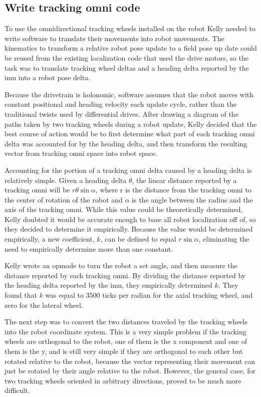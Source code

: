 \documentclass{article}
\begin{document}
\subsection{Write tracking omni code}
To use the omnidirectional tracking wheels installed on the robot Kelly needed to write software to translate their movements into robot movements. The kinematics to transform a relative robot pose update to a field pose up date could be reused from the existing localization code that used the drive motors, so the task was to translate tracking wheel deltas and a heading delta reported by the imu into a robot pose delta. 

Because the drivetrain is holonomic, software assumes that the robot moves with constant positional and heading velocity each update cycle, rather than the traditional twists used by differential drives. 
After drawing a diagram of the paths taken by two tracking wheels during a robot update, Kelly decided that the best course of action would be to first determine what part of each tracking omni delta was accounted for by the heading delta, and then transform the resulting vector from tracking omni space into robot space. 

Accounting for the portion of a tracking omni delta caused by a heading delta is relatively simple. Given a heading delta $\theta$, the linear distance reported by a tracking omni will be $r \theta \sin\alpha$, where r is the distance from the tracking omni to the center of rotation of the robot and $\alpha$ is the angle between the radius and the axis of the tracking omni. While this value could be theoretically determined, Kelly doubted it would be accurate enough to base all robot localization off of, so they decided to determine it empirically. Because the value would be determined empirically, a new coefficient, $k$, can be defined to equal $r \sin\alpha$, eliminating the need to empirically determine more than one constant.

Kelly wrote an opmode to turn the robot a set angle, and then measure the distance reported by each tracking omni. By dividing the distance reported by the heading delta reported by the imu, they empirically determined $k$. They found that $k$ was equal to 3500 ticks per radian for the axial tracking wheel, and zero for the lateral wheel. 

The next step was to convert the two distances traveled by the tracking wheels into the robot coordinate system. This is a very simple problem if the tracking wheels are orthogonal to the robot, one of them is the x component and one of them is the y, and is still very simple if they are orthogonal to each other but rotated relative to the robot, because the vector representing their movement can just be rotated by their angle relative to the robot. However, the general case, for two tracking wheels oriented in arbitrary directions, proved to be much more difficult. 
\end{document}
